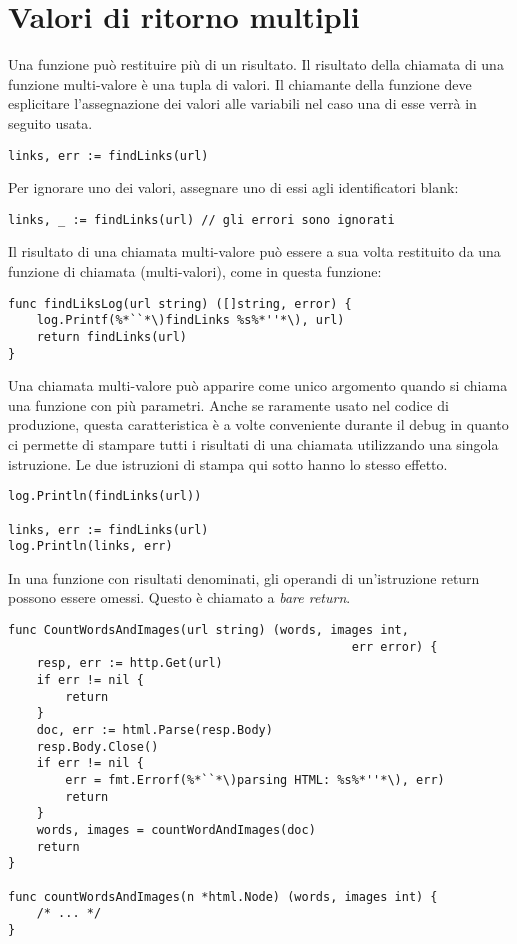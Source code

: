 \section{Valori di ritorno multipli}
\label{sec:valori_di_ritorno_multipli}%
Una funzione può restituire più di un risultato.
Il risultato della chiamata di una funzione multi-valore è una tupla di valori.
Il chiamante della funzione deve esplicitare l'assegnazione dei valori alle variabili nel caso una di esse verrà in seguito usata.
\begin{lstlisting}[frame=single, label={lst:lstlisting4-3.1}]
links, err := findLinks(url)
\end{lstlisting}
Per ignorare uno dei valori, assegnare uno di essi agli identificatori blank:
\begin{lstlisting}[frame=single, label={lst:lstlisting4-3.2}]
links, _ := findLinks(url) // gli errori sono ignorati
\end{lstlisting}
Il risultato di una chiamata multi-valore può essere a sua volta restituito da una funzione di chiamata (multi-valori), come in questa funzione:
\begin{lstlisting}[frame=single, label={lst:lstlisting4-3.3}]
func findLiksLog(url string) ([]string, error) {
    log.Printf(%*``*\)findLinks %s%*''*\), url)
    return findLinks(url)
}
\end{lstlisting}
Una chiamata multi-valore può apparire come unico argomento quando si chiama una funzione con più parametri.
Anche se raramente usato nel codice di produzione, questa caratteristica è a volte conveniente durante il debug in quanto ci permette di stampare tutti i risultati di una chiamata utilizzando una singola istruzione.
Le due istruzioni di stampa qui sotto hanno lo stesso effetto.
\begin{lstlisting}[frame=single, label={lst:lstlisting4-3.4}]
log.Println(findLinks(url))

links, err := findLinks(url)
log.Println(links, err)
\end{lstlisting}
In una funzione con risultati denominati, gli operandi di un'istruzione return possono essere omessi.
Questo è chiamato a \textit{bare return}.
\begin{lstlisting}[frame=single, label={lst:lstlisting4-3.5}]
func CountWordsAndImages(url string) (words, images int,
                                                err error) {
    resp, err := http.Get(url)
    if err != nil {
        return
    }
    doc, err := html.Parse(resp.Body)
    resp.Body.Close()
    if err != nil {
        err = fmt.Errorf(%*``*\)parsing HTML: %s%*''*\), err)
        return
    }
    words, images = countWordAndImages(doc)
    return
}

func countWordsAndImages(n *html.Node) (words, images int) {
    /* ... */
}
\end{lstlisting}

